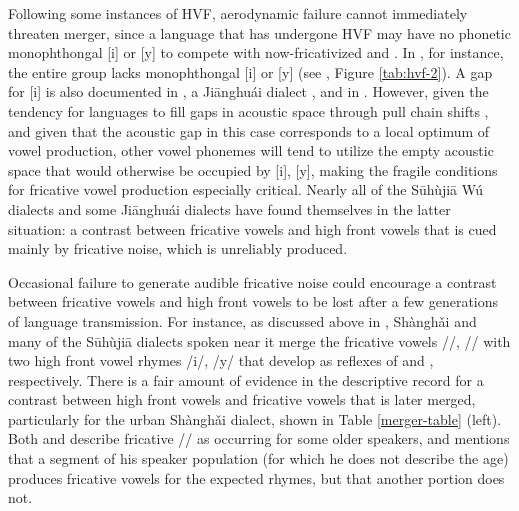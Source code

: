 \documentclass[output=paper,hidelinks]{langscibook}
\begin{document}
Following some instances of HVF, aerodynamic failure cannot immediately threaten merger, since a language that has undergone HVF may have no phonetic monophthongal [i] or [y] to compete with now-fricativized \pri{} and \pry{}. In \THW{}, for instance, the entire  group lacks monophthongal [i] or [y] (see , Figure \ref{tab:hvf-2}). A gap for [i] is also documented in , a Ji\={a}nghu\'{a}i  dialect \citep[53]{cai-yancheng}, and in  \citep[70--71]{westerberg}. However, given the tendency for languages to fill gaps in acoustic space through pull chain shifts \citep{labov-principles}, and given that the acoustic gap in this case corresponds to a local optimum of vowel production, other vowel phonemes will tend to utilize the empty acoustic space that would otherwise be occupied by [i], [y], making the fragile conditions for fricative vowel production especially critical. Nearly all of the S\=uh\`uji\=a Wú dialects and some Ji\={a}nghu\'{a}i  dialects have found themselves in the latter situation: a contrast between fricative vowels and high front vowels that is cued mainly by fricative noise, which is unreliably produced.

Occasional failure to generate audible fricative noise could encourage a contrast between fricative vowels and high front vowels to be lost after a few generations of language transmission. For instance, as discussed above in , Sh\`{a}ngh\v{a}i and many of the S\=uh\`uji\=a dialects spoken near it merge the fricative vowels /\iz/, /\yz/ with two high front vowel rhymes /i/, /y/ that develop as reflexes of \prien{} and \pryen{}, respectively. There is a fair amount of evidence in the descriptive record for a contrast between high front vowels and fricative vowels that is later merged, particularly for the urban Sh\`{a}ngh\v{a}i dialect, shown in Table \ref{merger-table} (left). Both \citet{zhu-grammar} and \citet{chen-gussenhoven} describe fricative /\iz{}/ as occurring for some older speakers, and \citet[45]{qian} mentions that a segment of his speaker population (for which he does not describe the age) produces fricative vowels for the expected rhymes, but that another portion does not.
\end{document}
